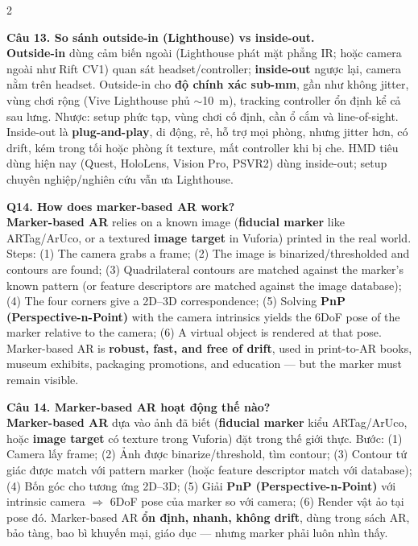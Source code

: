 \begin{paracol}{2}
\switchcolumn

\textbf{Câu 13. So sánh outside-in (Lighthouse) vs inside-out.}\\
\textbf{Outside-in} dùng cảm biến ngoài (Lighthouse phát mặt phẳng IR; hoặc camera ngoài như Rift CV1) quan sát headset/controller; \textbf{inside-out} ngược lại, camera nằm trên headset. Outside-in cho \textbf{độ chính xác sub-mm}, gần như không jitter, vùng chơi rộng (Vive Lighthouse phủ $\sim$10~m), tracking controller ổn định kể cả sau lưng. Nhược: setup phức tạp, vùng chơi cố định, cần ổ cắm và line-of-sight. Inside-out là \textbf{plug-and-play}, di động, rẻ, hỗ trợ mọi phòng, nhưng jitter hơn, có drift, kém trong tối hoặc phòng ít texture, mất controller khi bị che. HMD tiêu dùng hiện nay (Quest, HoloLens, Vision Pro, PSVR2) dùng inside-out; setup chuyên nghiệp/nghiên cứu vẫn ưa Lighthouse.

\switchcolumn*

\textbf{Q14. How does marker-based AR work?}\\
\textbf{Marker-based AR} relies on a known image (\textbf{fiducial marker} like ARTag/ArUco, or a textured \textbf{image target} in Vuforia) printed in the real world. Steps: (1) The camera grabs a frame; (2) The image is binarized/thresholded and contours are found; (3) Quadrilateral contours are matched against the marker's known pattern (or feature descriptors are matched against the image database); (4) The four corners give a 2D--3D correspondence; (5) Solving \textbf{PnP (Perspective-n-Point)} with the camera intrinsics yields the 6DoF pose of the marker relative to the camera; (6) A virtual object is rendered at that pose. Marker-based AR is \textbf{robust, fast, and free of drift}, used in print-to-AR books, museum exhibits, packaging promotions, and education --- but the marker must remain visible.

\switchcolumn

\textbf{Câu 14. Marker-based AR hoạt động thế nào?}\\
\textbf{Marker-based AR} dựa vào ảnh đã biết (\textbf{fiducial marker} kiểu ARTag/ArUco, hoặc \textbf{image target} có texture trong Vuforia) đặt trong thế giới thực. Bước: (1) Camera lấy frame; (2) Ảnh được binarize/threshold, tìm contour; (3) Contour tứ giác được match với pattern marker (hoặc feature descriptor match với database); (4) Bốn góc cho tương ứng 2D--3D; (5) Giải \textbf{PnP (Perspective-n-Point)} với intrinsic camera $\Rightarrow$ 6DoF pose của marker so với camera; (6) Render vật ảo tại pose đó. Marker-based AR \textbf{ổn định, nhanh, không drift}, dùng trong sách AR, bảo tàng, bao bì khuyến mại, giáo dục --- nhưng marker phải luôn nhìn thấy.


\end{paracol}
